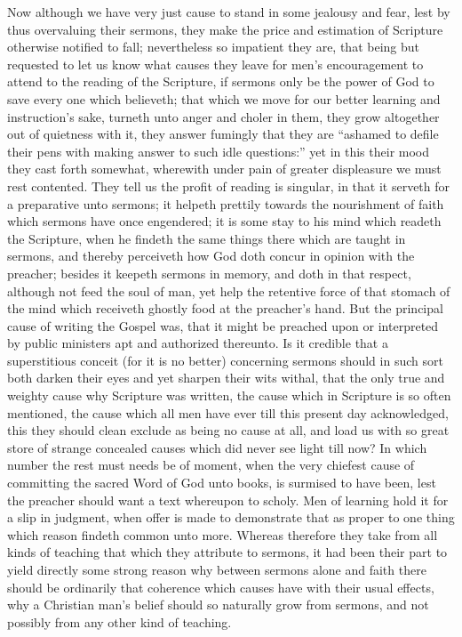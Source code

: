 Now although we have very just cause to stand in some jealousy and fear, lest by thus overvaluing their sermons, they make the price and estimation of Scripture otherwise notified to fall; nevertheless so impatient they are, that being but requested to let us know what causes they leave for men’s encouragement to attend to the reading of the Scripture, if sermons only be the power of God to save every one which believeth; that which we move for our better learning and instruction’s sake, turneth unto anger and choler in them, they grow altogether out of quietness with it, they answer fumingly that they are “ashamed to defile their pens with making answer to such idle questions:” yet in this their mood they cast forth somewhat, wherewith under pain of greater displeasure we must rest contented. They tell us the profit of reading is singular, in that it serveth for a preparative unto sermons; it helpeth prettily towards the nourishment of faith which sermons have once engendered; it is some stay to his mind which readeth the Scripture, when he findeth the same things there which are taught in sermons, and thereby perceiveth how God doth concur in opinion with the preacher; besides it keepeth sermons in memory, and doth in that respect, although not feed the soul of man, yet help the retentive force of that stomach of the mind which receiveth ghostly  food at the preacher’s hand. But the principal cause of writing the Gospel was, that it might be preached upon or interpreted by public ministers apt and authorized thereunto. Is it credible that a superstitious conceit (for it is no better) concerning sermons should in such sort both darken their eyes and yet sharpen their wits withal, that the only true and weighty cause why Scripture was written, the cause which in Scripture is so often mentioned, the cause which all men have ever till this present day acknowledged, this they should clean exclude as being no cause at all, and load us with so great store of strange concealed causes which did never see light till now? In which number the rest must needs be of moment, when the very chiefest cause of committing the sacred Word of God unto books, is surmised to have been, lest the preacher should want a text whereupon to scholy.
Men of learning hold it for a slip in judgment, when offer is made to demonstrate that as proper to one thing which reason findeth common unto more. Whereas therefore they take from all kinds of teaching that which they attribute to sermons, it had been their part to yield directly some strong reason why between sermons alone and faith there should be ordinarily that coherence which causes have with their usual effects, why a Christian man’s belief should so naturally grow from sermons, and not possibly from any other kind of teaching.
